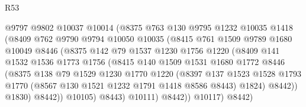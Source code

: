 \begin{lexlean}{R53}
\begin{coremodule}
                        @9797
                        @9802
                        @10037
                        @10014
                        (@8375
                          @763
                          @130
                          @9795
                          @1232
                          @10035
                          @1418
                          (@8409
                            @762
                            @9790
                            @9794
                            @10050
                            @10035
                            (@8415
                              @761
                              @1509
                              @9789
                              @1680
                              @10049
                              @8446
                              (@8375
                                @142
                                @79
                                @1537
                                @1230
                                @1756
                                @1220
                                (@8409
                                  @141
                                  @1532
                                  @1536
                                  @1773
                                  @1756
                                  (@8415
                                    @140
                                    @1509
                                    @1531
                                    @1680
                                    @1772
                                    @8446
                                    (@8375
                                      @138
                                      @79
                                      @1529
                                      @1230
                                      @1770
                                      @1220
                                      (@8397
                                        @137
                                        @1523
                                        @1528
                                        @1793
                                        @1770
                                        (@8567 @130 @1521 @1232 @1791 @1418 @8586 @8443)
                                        @1824)
                                      @8442))
                                  @1830)
                                @8442))
                            @10105)
                          @8443)
                        @10111)
                      @8442))
                  @10117)
                @8442)

\end{coremodule}
\end{lexlean}
